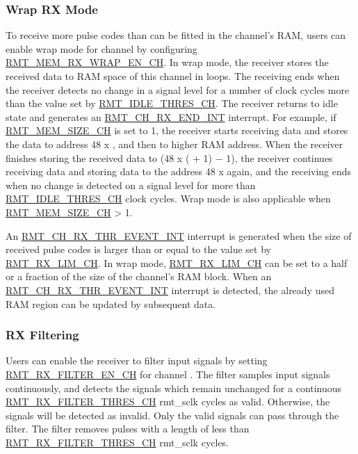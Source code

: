 \documentclass[main\_\_EN.tex]{subfiles}
\begin{document}
\subsubsection{Wrap RX Mode}

To receive more pulse codes than can be fitted in the channel's RAM, users can enable wrap mode for channel  by configuring \hyperref[fielddesc:RMTMEMRXWRAPENCHM]{RMT\_MEM\_RX\_WRAP\_EN\_CH}. In wrap mode, the receiver stores the received data to RAM space of this channel in loops. The receiving ends when the receiver detects no change in a signal level for a number of clock cycles more than the value set by \hyperref[fielddesc:RMTIDLETHRESCHM]{RMT\_IDLE\_THRES\_CH}. The receiver returns to idle state and generates an \hyperref[int:RMTCHnRXENDINT]{RMT\_CH\_RX\_END\_INT} interrupt. For example, if \hyperref[fielddesc:RMTMEMSIZECHM]{RMT\_MEM\_SIZE\_CH} is set to 1, the receiver starts receiving data and stores the data to address 48 x , and then to higher RAM address. When the receiver finishes storing the received data to (48 x ( $+$ 1) $-$ 1), the receiver continues receiving data and storing data to the address 48 x   again, and the receiving ends when no change is detected on a signal level for more than \hyperref[fielddesc:RMTIDLETHRESCHM]{RMT\_IDLE\_THRES\_CH} clock cycles. Wrap mode is also applicable when \hyperref[fielddesc:RMTMEMSIZECHM]{RMT\_MEM\_SIZE\_CH} > 1.

An \hyperref[int:RMTCHmRXTHREVENTINT]{RMT\_CH\_RX\_THR\_EVENT\_INT} interrupt is generated when the size of received pulse codes is larger than or equal to the value set by \hyperref[fielddesc:RMTRXLIMCHM]{RMT\_RX\_LIM\_CH}.
In wrap mode, \hyperref[fielddesc:RMTRXLIMCHM]{RMT\_RX\_LIM\_CH} can be set to a half or a fraction of the size of the channel's RAM block.
When an \hyperref[int:RMTCHmRXTHREVENTINT]{RMT\_CH\_RX\_THR\_EVENT\_INT} interrupt is detected, the already used RAM region can be updated by subsequent data.


\subsubsection{RX Filtering}

Users can enable the receiver to filter input signals by setting \hyperref[fielddesc:RMTRXFILTERENCHM]{RMT\_RX\_FILTER\_EN\_CH} for channel . The filter samples input signals continuously, and detects the signals which remain unchanged for a continuous \hyperref[fielddesc:RMTRXFILTERTHRESCHM]{RMT\_RX\_FILTER\_THRES\_CH} rmt\_sclk cycles as valid. Otherwise, the signals will be detected as invalid. Only the valid signals can pass through the filter. The filter removes pulses with a length of less than \hyperref[fielddesc:RMTRXFILTERTHRESCHM]{RMT\_RX\_FILTER\_THRES\_CH} rmt\_sclk cycles.
\end{document}
